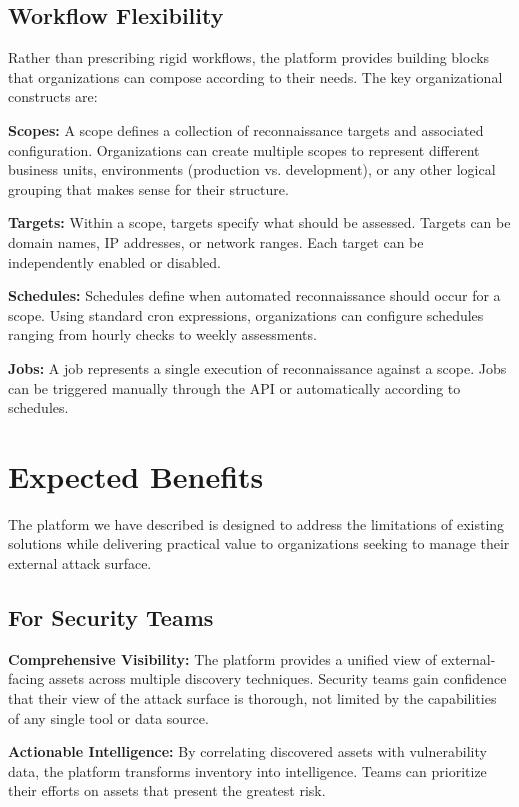 \documentclass[a4paper,12pt]{report}
\begin{document}
\subsection{Workflow Flexibility}

Rather than prescribing rigid workflows, the platform provides building blocks that organizations can compose according to their needs. The key organizational constructs are:\hfill \break

\textbf{Scopes:} A scope defines a collection of reconnaissance targets and associated configuration. Organizations can create multiple scopes to represent different business units, environments (production vs. development), or any other logical grouping that makes sense for their structure.\hfill \break

\textbf{Targets:} Within a scope, targets specify what should be assessed. Targets can be domain names, IP addresses, or network ranges. Each target can be independently enabled or disabled.\hfill \break

\textbf{Schedules:} Schedules define when automated reconnaissance should occur for a scope. Using standard cron expressions, organizations can configure schedules ranging from hourly checks to weekly assessments.\hfill \break

\textbf{Jobs:} A job represents a single execution of reconnaissance against a scope. Jobs can be triggered manually through the API or automatically according to schedules.\hfill \break
\section{Expected Benefits}

The platform we have described is designed to address the limitations of existing solutions while delivering practical value to organizations seeking to manage their external attack surface.

\subsection{For Security Teams}

\textbf{Comprehensive Visibility:} The platform provides a unified view of external-facing assets across multiple discovery techniques. Security teams gain confidence that their view of the attack surface is thorough, not limited by the capabilities of any single tool or data source.\hfill \break

\textbf{Actionable Intelligence:} By correlating discovered assets with vulnerability data, the platform transforms inventory into intelligence. Teams can prioritize their efforts on assets that present the greatest risk.\hfill \break
\end{document}
